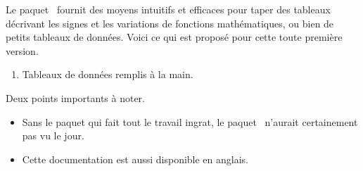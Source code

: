 \documentclass[10pt, a4paper]{article}
\begin{document}
\noindent
Le paquet \thispack\ fournit des moyens intuitifs et efficaces pour taper des tableaux décrivant les signes et les variations de fonctions mathématiques, ou bien de petits tableaux de données.
Voici ce qui est proposé pour cette toute première version.
\begin{enumerate}
	\item Tableaux de données remplis à la main.%

%
%
\end{enumerate}

\medskip

\noindent
Deux points importants à noter.
\begin{itemize}
    \item Sans le paquet  qui fait tout le travail ingrat, le paquet \thispack\ n'aurait certainement pas vu le jour.

    \item Cette documentation est aussi disponible en anglais.
\end{itemize}




\tdocsep
\end{document}
